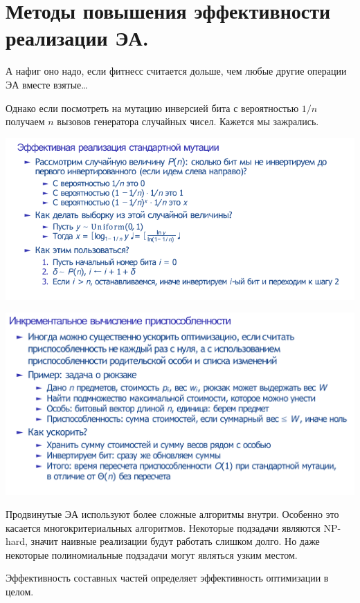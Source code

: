 \section{Методы повышения эффективности реализации ЭА.}

А нафиг оно надо, если фитнесс считается дольше, чем любые
другие операции ЭА вместе взятые\dots

Однако если посмотреть на мутацию инверсией бита с вероятностью
$1/n$ получаем $n$ вызовов генератора случайных чисел. Кажется
мы зажрались.

\includegraphics[scale=0.7]{images/38effective_mutation}

\includegraphics[scale=0.3]{images/38incr_adap}

Продвинутые ЭА используют более сложные алгоритмы внутри.
Особенно это касается многокритериальных алгоритмов. Некоторые
подзадачи являются NP-hard, значит наивные реализации будут
работать слишком долго. Но даже некоторые полиномиальные
подзадачи могут являться узким местом.

Эффективность составных частей определяет эффективность оптимизации
в целом.
